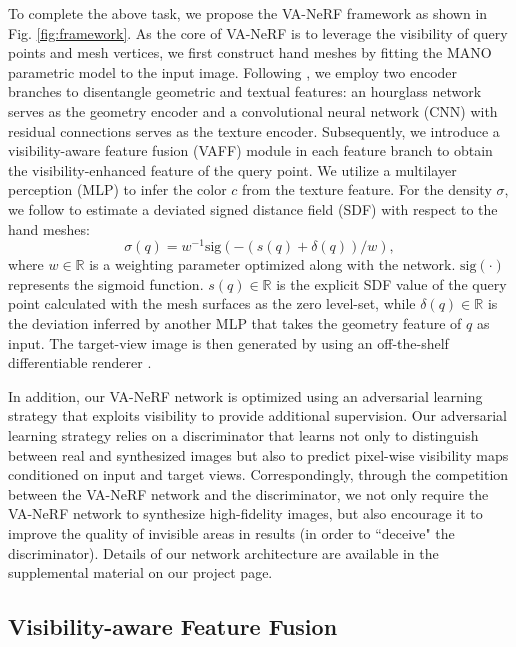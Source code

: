 \documentclass[letterpaper]{article} %
\begin{document}
To complete the above task, we propose the VA-NeRF framework as shown in Fig. \ref{fig:framework}. As the core of VA-NeRF is to leverage the visibility of query points and mesh vertices, we first construct hand meshes by fitting the MANO parametric model \cite{romero2017embodied} to the input image. Following \cite{mihajlovic2022keypointnerf}, we employ two encoder branches to disentangle geometric and textual features: an hourglass network \cite{newell2016stacked} serves as the geometry encoder and a convolutional neural network (CNN) with residual connections \cite{johnson2016perceptual} serves as the texture encoder. Subsequently, we introduce a visibility-aware feature fusion (VAFF) module in each feature branch to obtain the visibility-enhanced feature of the query point. We utilize a multilayer perception (MLP) to infer the color $c$ from the texture feature. For the density $\sigma$, we follow \cite{hong2022eva3d} to estimate a deviated signed distance field (SDF) with respect to the hand meshes:
\begin{equation}
    \sigma(q) = {w^{ - 1}}\mathrm{sig}( - (s(q) + \delta (q))/w),
    \label{eq:sdf}
\end{equation}
where $w \in \mathbb{R}$ is a weighting parameter optimized along with the network. $\mathrm{sig}(\cdot)$ represents the sigmoid function. $s(q) \in \mathbb{R}$ is the explicit SDF value of the query point calculated with the mesh surfaces as the zero level-set, while $\delta (q) \in \mathbb{R}$ is the deviation inferred by another MLP that takes the geometry feature of $q$ as input. The target-view image is then generated by using an off-the-shelf differentiable renderer \cite{wang2021ibrnet}.

In addition, our VA-NeRF network is optimized using an adversarial learning strategy that exploits visibility to provide additional supervision. Our adversarial learning strategy relies on a discriminator that learns not only to distinguish between real and synthesized images but also to predict pixel-wise visibility maps conditioned on input and target views. Correspondingly, through the competition between the VA-NeRF network and the discriminator, we not only require the VA-NeRF network to synthesize high-fidelity images, but also encourage it to improve the quality of invisible areas in results (in order to ``deceive" the discriminator). Details of our network architecture are available in the supplemental material on our project page.

\subsection{Visibility-aware Feature Fusion}
\label{sec:attn}
\end{document}

